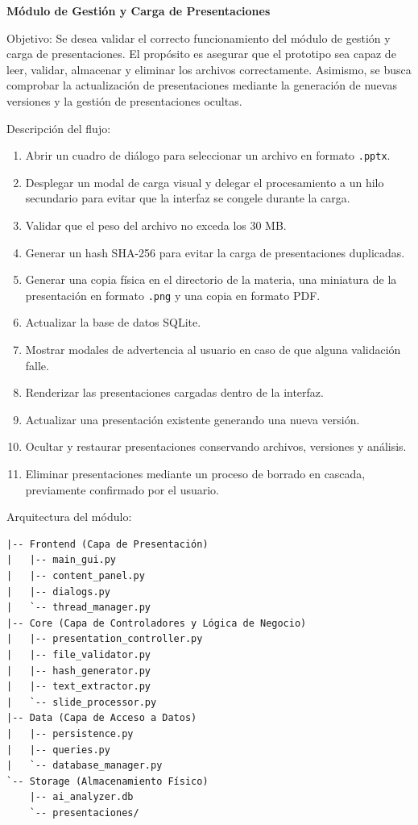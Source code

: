 \documentclass[11pt]{article}
\begin{document}
\textbf{Módulo de Gestión y Carga de Presentaciones}

Objetivo: Se desea validar el correcto funcionamiento del módulo de gestión y carga de presentaciones. El propósito es asegurar que el prototipo sea capaz de leer, validar, almacenar y eliminar los archivos correctamente. Asimismo, se busca comprobar la actualización de presentaciones mediante la generación de nuevas versiones y la gestión de presentaciones ocultas.

Descripción del flujo:
\begin{enumerate}
    \item Abrir un cuadro de diálogo para seleccionar un archivo en formato \texttt{.pptx}.
    \item Desplegar un modal de carga visual y delegar el procesamiento a un hilo secundario para evitar que la interfaz se congele durante la carga.
    \item Validar que el peso del archivo no exceda los 30 MB.
    \item Generar un hash SHA-256 para evitar la carga de presentaciones duplicadas.
    \item Generar una copia física en el directorio de la materia, una miniatura de la presentación en formato \texttt{.png} y una copia en formato PDF.
    \item Actualizar la base de datos SQLite.
    \item Mostrar modales de advertencia al usuario en caso de que alguna validación falle.
    \item Renderizar las presentaciones cargadas dentro de la interfaz.
    \item Actualizar una presentación existente generando una nueva versión.
    \item Ocultar y restaurar presentaciones conservando archivos, versiones y análisis.
    \item Eliminar presentaciones mediante un proceso de borrado en cascada, previamente confirmado por el usuario.
\end{enumerate}

Arquitectura del módulo:
\begin{verbatim}
|-- Frontend (Capa de Presentación)
|   |-- main_gui.py
|   |-- content_panel.py
|   |-- dialogs.py
|   `-- thread_manager.py
|-- Core (Capa de Controladores y Lógica de Negocio)
|   |-- presentation_controller.py
|   |-- file_validator.py
|   |-- hash_generator.py
|   |-- text_extractor.py
|   `-- slide_processor.py
|-- Data (Capa de Acceso a Datos)
|   |-- persistence.py
|   |-- queries.py
|   `-- database_manager.py
`-- Storage (Almacenamiento Físico)
    |-- ai_analyzer.db
    `-- presentaciones/
\end{verbatim}
\end{document}
